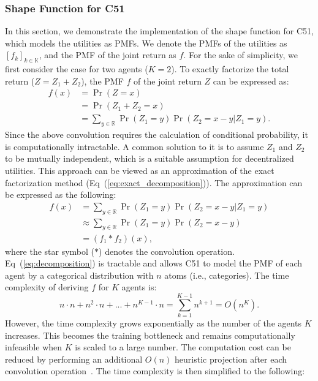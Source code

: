 \documentclass[twoside,11pt]{article}
\newcommand{\agentspace}{\mathbb{K}}
\newcommand{\agentcounter}{k}
\newcommand{\numberofagents}{K}
\begin{document}
\subsubsection{Shape Function for C51}
\label{subsec:shape_function_for_c51}
In this section, we demonstrate the implementation of the shape function for C51, which models the utilities as PMFs.
We denote the PMFs of the utilities as $[f_\agentcounter]_{\agentcounter\in\agentspace}$, and the PMF of the joint return as $f$.
For the sake of simplicity, we first consider the case for two agents ($\numberofagents{}=2$).
To exactly factorize the total return ($Z=Z_1+Z_2$), the PMF $f$ of the joint return $Z$ can be expressed as:
\begin{equation}
\begin{split}
f(x)&=\Pr(Z=x) \\
&=\Pr(Z_1+Z_2=x) \\
&=\sum_{y\in\mathbb{R}} \Pr(Z_1=y)\Pr(Z_2=x-y|Z_1=y).
\end{split}
\label{eq:exact_decomposition}
\end{equation}
Since the above convolution requires the calculation of conditional probability, it is computationally intractable. A common solution to it is to assume $Z_1$ and $Z_2$ to be mutually independent, which is a suitable assumption for decentralized utilities. This approach can be viewed as an approximation of the exact factorization method (Eq~(\ref{eq:exact_decomposition})).
The approximation can be expressed as the following:
\begin{equation}
\begin{split}
f(x)&=\sum_{y\in\mathbb{R}} \Pr(Z_1=y)\Pr(Z_2=x-y|Z_1=y) \\
&\approx\sum_{y\in\mathbb{R}} \Pr(Z_1=y)\Pr(Z_2=x-y) \\
&=(f_1*f_2)(x),
\label{eq:decomposition}
\end{split}
\end{equation}
where the star symbol ($*$) denotes the convolution operation. Eq~(\ref{eq:decomposition}) is tractable and allows C51 to model the PMF of each agent by a categorical distribution with $n$ atoms (i.e., categories). The time complexity of deriving $f$ for $\numberofagents{}$ agents is:
\begin{equation}
    n\cdot n+n^2\cdot n+...+n^{\numberofagents{}-1}\cdot n=\sum^{\numberofagents{}-1}_{k=1}n^{k+1}=O(n^\numberofagents{}).
    \label{eq:projection}
\end{equation}
However, the time complexity grows exponentially as the number of the agents $\numberofagents{}$ increases. This becomes the training bottleneck and remains computationally infeasible when $\numberofagents{}$ is scaled to a large number. The computation cost can be reduced by performing an additional $O(n)$ heuristic projection after each convolution operation~\citep{Lin2019DR-DRL}. The time complexity is then simplified to the following:
\end{document}
